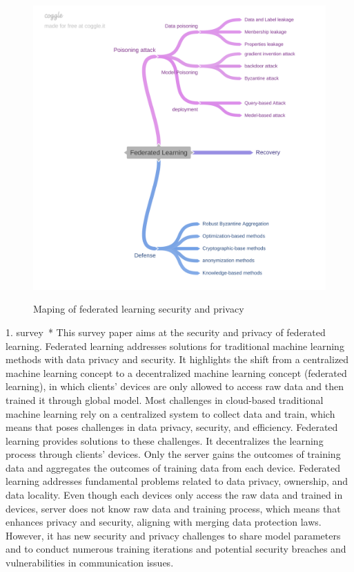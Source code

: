\documentclass[manuscript,screen,review]{acmart}
\begin{document}
\begin{figure}[t]
\centering
{\includegraphics [width=1\textwidth]{graphics/maps}}
\caption{Maping of federated learning security and privacy
}
\label{fig:SPSC}
\end{figure}



1. survey~\cite{mothukuri2021survey}*
This survey paper aims at the security and privacy of federated learning. Federated learning addresses solutions for traditional machine learning methods with data privacy and security. It highlights the shift from a centralized machine learning concept to a decentralized machine learning concept (federated learning), in which clients' devices are only allowed to access raw data and then trained it through global model. Most challenges in cloud-based traditional machine learning rely on a centralized system to collect data and train, which means that poses challenges in data privacy, security, and efficiency. Federated learning provides solutions to these challenges. It decentralizes the learning process through clients' devices. Only the server gains the outcomes of training data and aggregates the outcomes of training data from each device. Federated learning addresses fundamental problems related to data privacy, ownership, and data locality. Even though each devices only access the raw data and trained in devices, server does not know raw data and training process, which means that enhances privacy and security, aligning with merging data protection laws. However, it has new security and privacy challenges to share model parameters and to conduct numerous training iterations and potential security breaches and vulnerabilities in communication issues.       
\end{document}
